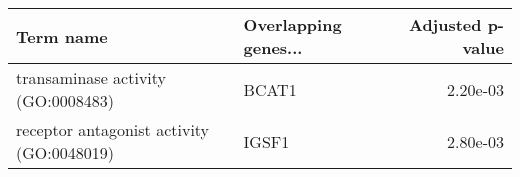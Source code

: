 \begin{tabular}{llr}
\toprule
                                Term name & Overlapping genes... &  Adjusted p-value \\
\midrule
       transaminase activity (GO:0008483) &                BCAT1 &          2.20e-03 \\
receptor antagonist activity (GO:0048019) &                IGSF1 &          2.80e-03 \\
\bottomrule
\end{tabular}
